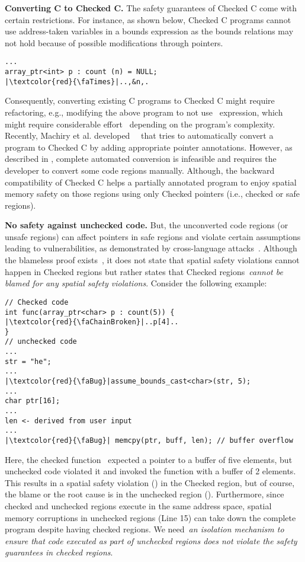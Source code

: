 \noindent
\textbf{Converting C to Checked C.} The safety guarantees of Checked C come with certain restrictions. For instance, as shown below, Checked C programs cannot use address-taken variables in a bounds expression as the bounds relations may not hold because of possible modifications through pointers.
\begin{verbatim}
...
array_ptr<int> p : count (n) = NULL;
|\textcolor{red}{\faTimes}|..,&n,.
\end{verbatim}
Consequently, converting existing C programs to Checked C might require refactoring, e.g., modifying the above program to not use~ expression, which might require considerable effort~\cite{duanrefactoring} depending on the program's complexity. 
Recently, Machiry et al. developed~\threec~\cite{machiry2022c} that tries to automatically convert a program to Checked C by adding appropriate pointer annotations.
However, as described in \threec, complete automated conversion is infeasible and requires the developer to convert some code regions manually.
Although, the backward compatibility of Checked C helps a partially annotated program to enjoy spatial memory safety on those regions using only Checked pointers (i.e., checked or safe regions).

\noindent
\textbf{No safety against unchecked code.} But, the unconverted code regions (or unsafe regions) can affect pointers in safe regions and violate certain assumptions leading to vulnerabilities, as demonstrated by cross-language attacks~\cite{mergendahlcross}.
Although the blameless proof exists~\cite{ruef2019achieving}, it does not state that spatial safety violations cannot happen in Checked regions but rather states that Checked regions~\emph{cannot be blamed for any spatial safety violations}.
Consider the following example:
\begin{verbatim}
// Checked code
int func(array_ptr<char> p : count(5)) {
|\textcolor{red}{\faChainBroken}|..p[4]..
}
// unchecked code
...
str = "he";
...
|\textcolor{red}{\faBug}|assume_bounds_cast<char>(str, 5); 
...
char ptr[16];
...
len <- derived from user input
...
|\textcolor{red}{\faBug}| memcpy(ptr, buff, len); // buffer overflow
\end{verbatim}
Here, the checked function~ expected a pointer to a buffer of five elements, but unchecked code violated it and invoked the function with a buffer of 2 elements.
This results in a spatial safety violation (\textcolor{red}{\faChainBroken}) in the Checked region, but of course, the blame or the root cause is in the unchecked region (\textcolor{red}{\faBug}).
Furthermore, since checked and unchecked regions execute in the same address space, spatial memory corruptions in unchecked regions (Line 15) can take down the complete program despite having checked regions.
We need~\emph{an isolation mechanism to ensure that code executed as part of unchecked regions does not violate the safety guarantees in checked regions}.

